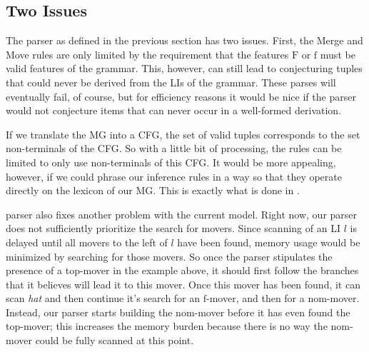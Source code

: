 \subsection{Two Issues}
\label{sub:MG-TopDown_Issues}
The parser as defined in the previous section has two issues.
First, the Merge and Move rules are only limited by the requirement that the features $\mathrm{F}$ or $\mathrm{f}$ must be valid features of the grammar.
This, however, can still lead to conjecturing tuples that could never be derived from the LIs of the grammar.
These parses will eventually fail, of course, but for efficiency reasons it would be nice if the parser would not conjecture items that can never occur in a well-formed derivation.

If we translate the MG into a CFG, the set of valid tuples corresponds to the set non-terminals of the CFG.
So with a little bit of processing, the rules can be limited to only use non-terminals of this CFG\@.
It would be more appealing, however, if we could phrase our inference rules in a way so that they operate directly on the lexicon of our MG\@.
This is exactly what is done in \citet{Stabler12}.

 parser also fixes another problem with the current model.
Right now, our parser does not sufficiently prioritize the search for movers.
Since scanning of an LI $l$ is delayed until all movers to the left of $l$ have been found, memory usage would be minimized by searching for those movers.
So once the parser stipulates the presence of a top-mover in the example above, it should first follow the branches that it believes will lead it to this mover.
Once this mover has been found, it can scan \emph{hat} and then continue it's search for an $\mathrm{f}$-mover, and then for a nom-mover.
Instead, our parser starts building the nom-mover before it has even found the top-mover; this increases the memory burden because there is no way the nom-mover could be fully scanned at this point.

